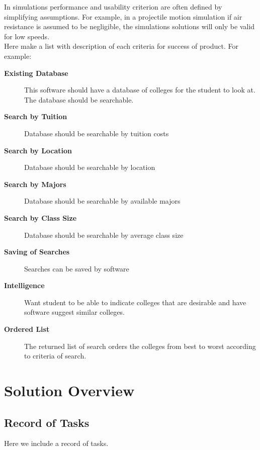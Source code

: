 \documentclass{tufte-book}
\begin{document}
In simulations performance and usability criterion are often defined by simplifying assumptions. For example, in a projectile motion simulation if air resistance is assumed to be negligible, the simulations solutions will only be valid for low speeds.\\

Here make a list with description of each criteria for success of product.
For example:
\begin{description}
\item[\textbf{Existing Database}]  This software should have a database of colleges for the student to look at.  The database should be searchable.
\item[\textbf{Search by Tuition}] Database should be searchable by tuition costs
\item[\textbf{Search by Location}] Database should be searchable by location
\item[\textbf{Search by Majors}] Database should be searchable by available majors
\item[\textbf{Search by Class Size}] Database should be searchable by average class size
\item[\textbf{Saving of Searches}]  Searches can be saved by software
\item[\textbf{Intelligence}] Want student to be able to indicate colleges that are desirable and have software suggest similar colleges.
\item[\textbf{Ordered List}] The returned list of search orders the colleges from best to worst according to criteria of search.
\end{description}

\chapter{Solution Overview}




\section{Record of Tasks}
Here we include a record of tasks.
\end{document}
